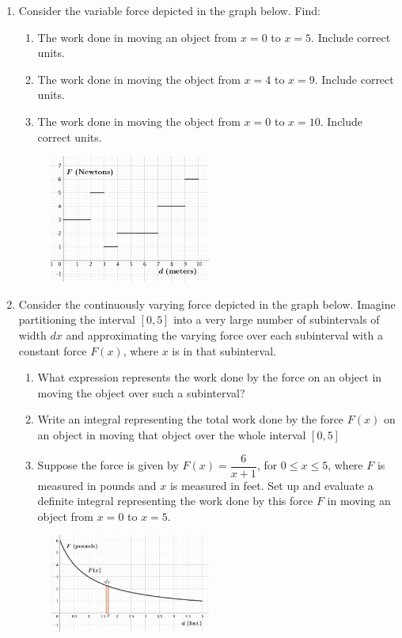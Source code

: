 \documentclass[12pt,letterpaper,fleqn]{article}
\theoremstyle{definition}
\begin{document}
\begin{enumerate}
  \item Consider the variable force depicted in the graph below. Find:
  \begin{enumerate}
    \item The work done in moving an object from $x=0$ to $x=5$. Include correct units.
    \item The work done in moving the object from $x=4$ to $x=9$. Include correct units.
    \item The work done in moving the object from $x=0$ to $x=10$. Include correct units.
  \end{enumerate}
  \begin{figure}[!htb]
	\centering
	\includegraphics[width=0.5\textwidth]{img/variable_force.png}
\end{figure}
\newpage
\item Consider the continuously varying force depicted in the graph below. Imagine partitioning the interval $[0,5]$ into a very large number of subintervals of width $dx$ and approximating the varying force over each subinterval with a constant force $F(x)$, where $x$ is in that subinterval.
\begin{enumerate}
  \item What expression represents the work done by the force on an object in moving the object over such a subinterval?
  \item Write an integral representing the total work done by the force $F(x)$ on an object in moving that object over the whole interval $[0,5]$
  \item Suppose the force is given by $F(x) = \dfrac{6}{x+1}$, for $0\leq x\leq 5$, where $F$ is measured in pounds and $x$ is measured in feet. Set up and evaluate a definite integral representing the work done by this force $F$ in moving an object from $x=0$ to $x=5$.
\end{enumerate}
\begin{figure}[!htb]
	\centering
	\includegraphics[width=0.5\textwidth]{img/continuous_force.png}
\end{figure}
\end{enumerate}
\end{document}
